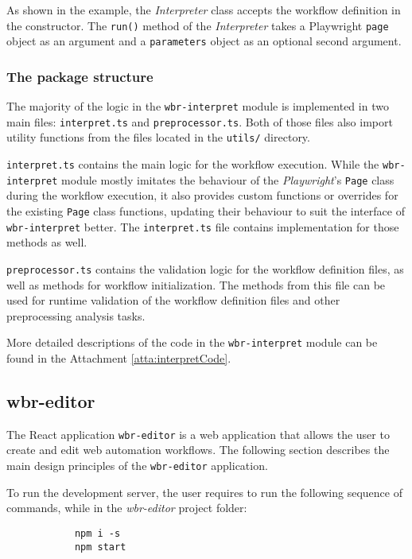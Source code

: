As shown in the example, the \textit{Interpreter} class accepts the workflow definition in the constructor. The \texttt{run()} method of the \textit{Interpreter} takes a Playwright \texttt{page} object as an argument and a \texttt{parameters} object as an optional second argument.

\subsubsection{The package structure}

The majority of the logic in the \texttt{wbr-interpret} module is implemented in two main files: \texttt{interpret.ts} and \texttt{preprocessor.ts}.
Both of those files also import utility functions from the files located in the \texttt{utils/} directory.

\texttt{interpret.ts} contains the main logic for the workflow execution. 
While the \texttt{wbr-interpret} module mostly imitates the behaviour of the \textit{Playwright}'s \texttt{Page} class during the workflow execution,
it also provides custom functions or overrides for the existing \texttt{Page} class functions, updating their behaviour to suit the interface of \texttt{wbr-interpret} better.
The \texttt{interpret.ts} file contains implementation for those methods as well. 

\texttt{preprocessor.ts} contains the validation logic for the workflow definition files, as well as methods for workflow initialization.
The methods from this file can be used for runtime validation of the workflow definition files
and other preprocessing analysis tasks.

More detailed descriptions of the code in the \texttt{wbr-interpret} module can be found in the Attachment \ref{atta:interpretCode}.

\subsection{wbr-editor}

The React application \texttt{wbr-editor} is a web application that allows the user to create and edit web automation workflows.
The following section describes the main design principles of the \texttt{wbr-editor} application.

To run the development server, the user requires to run the following sequence of commands, while in the \textit{wbr-editor} project folder:
\begin{center}
    \begin{minipage}[h!]{0.5\textwidth}
        \begin{verbatim}
            npm i -s
            npm start
        \end{verbatim}        
    \end{minipage}
\end{center}

